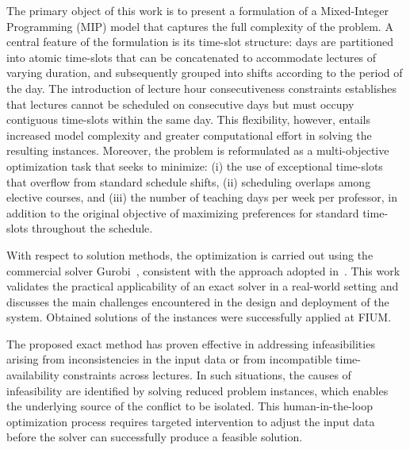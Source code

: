 

The primary object of this work is to present a formulation of a Mixed-Integer Programming (MIP) model 
that captures the full complexity of the problem.
A central feature of the formulation is its time-slot structure: 
days are partitioned into atomic time-slots that can be concatenated to accommodate lectures of varying duration, and subsequently grouped into shifts according to the period of the day.
The introduction of lecture hour consecutiveness constraints establishes that lectures cannot be scheduled on consecutive days but must occupy contiguous time-slots within the same day. This flexibility, however, entails increased model complexity and greater computational effort in solving the resulting instances.
Moreover, the problem is reformulated as a multi-objective optimization task that seeks to minimize:
(i) the use of exceptional time-slots that overflow from standard schedule shifts,
(ii) scheduling overlaps among elective courses, 
and (iii) the number of teaching days per week per professor, 
in addition to the original objective of maximizing preferences for standard time-slots throughout the schedule.



With respect to solution methods, 
the optimization is carried out using the commercial solver Gurobi~\cite{gurobi}, 
consistent with the approach adopted in~\cite{zunino2024automated}.
This work validates the practical applicability of an exact solver in a real-world setting and discusses the main challenges encountered in the design and deployment of the system. Obtained solutions of the instances were successfully applied at FIUM.

The proposed exact method has proven effective in addressing infeasibilities arising from inconsistencies in the input data or from incompatible time-availability constraints across lectures. In such situations, the causes of infeasibility are identified by solving reduced problem instances, which enables the underlying source of the conflict to be isolated. This human-in-the-loop optimization process requires targeted intervention to adjust the input data before the solver can successfully produce a feasible solution.

